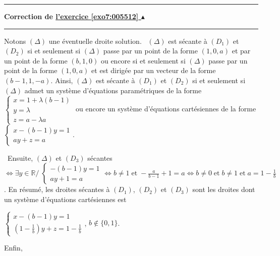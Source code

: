 \documentclass[11pt,a4paper]{article}
\newcommand{\Rr}{\mathbb{R}} \newcommand{\R}{\mathbb{R}}
\newcounter{exo}
\newcommand{\correction}[1]{\hypertarget{cor7:#1}{}\label{cor7:#1}{\bf Correction de \hyperlink{exo7:#1}{l'exercice \ref{exo7:#1} $\blacktriangle$}}\vspace{1mm}\hrule\vspace{1mm}}
\newcommand{\fincorrection}{\vspace{1mm}\hrule\vspace*{7mm}}
\begin{document}
\begin{center}
\end{center}
\fincorrection
\correction{005512}
Notons $(\Delta)$ une éventuelle droite solution.
\textbullet~$(\Delta)$ est sécante à $(D_1)$ et $(D_2)$ si et seulement si $(\Delta)$ passe par un point de la forme $(1,0,a)$ et par un point de la forme $(b,1,0)$ ou encore si et seulement si $(\Delta)$ passe par un point de la forme $(1,0,a)$ et est dirigée par un vecteur de la forme $(b-1,1,-a)$.
Ainsi, $(\Delta)$ est sécante à $(D_1)$ et $(D_2)$ si et seulement si $(\Delta)$ admet un système d'équations paramétriques de la forme $\left\{
\begin{array}{l}
x=1+\lambda(b-1)\\
y=\lambda\\
z=a-\lambda a
\end{array}
\right.$ ou encore un système d'équations cartésiennes de la forme $\left\{
\begin{array}{l}
x-(b-1)y=1\\
ay+z=a
\end{array}
\right.$.

\textbullet~Ensuite, $(\Delta)$ et $(D_3)$ sécantes $\Leftrightarrow\exists y\in\Rr/\;\left\{
\begin{array}{l}
-(b-1)y=1\\
ay+1=a
\end{array}
\right.\Leftrightarrow b\neq 1\;\text{et}\;-\frac{a}{b-1}+1=a\Leftrightarrow b\neq0\;\text{et}\;b\neq1\;\text{et}\;a=1-\frac{1}{b}$.
En résumé, les droites sécantes à $(D_1)$, $(D_2)$ et $(D_3)$ sont les droites dont un système d'équations cartésiennes est 

\begin{center}
$\left\{
\begin{array}{l}
x-(b-1)y=1\\
\left(1-\frac{1}{b}\right)y+z=1-\frac{1}{b}
\end{array}
\right.$, $b\notin\{0,1\}$.
\end{center}
Enfin,
\end{document}
